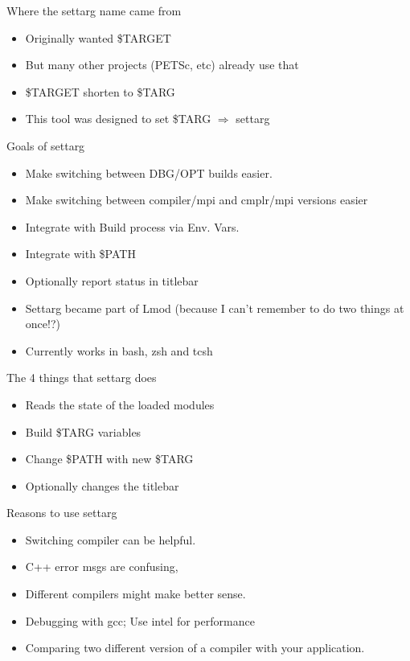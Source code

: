 \documentclass{beamer}
\begin{document}
\begin{frame}{Where the settarg name came from}
  \begin{itemize}
    \item Originally wanted \$TARGET
    \item But many other projects (PETSc, etc) already use that
    \item \$TARGET shorten to \$TARG
    \item This tool was designed to set \$TARG $\Rightarrow$ {\color{blue}settarg}
  \end{itemize}
\end{frame}

\begin{frame}{Goals of settarg}
  \begin{itemize}
    \item Make switching between DBG/OPT builds easier.
    \item Make switching between compiler/mpi and cmplr/mpi versions easier
    \item Integrate with Build process via Env. Vars.
    \item Integrate with \$PATH
    \item Optionally report status in titlebar
    \item Settarg became part of Lmod (because I can't remember to do
      two things at once!?)
    \item Currently works in bash, zsh and tcsh
  \end{itemize}
\end{frame}

\begin{frame}{The 4 things that settarg does}
  \begin{itemize}
    \item Reads the state of the loaded modules
    \item Build \$TARG variables
    \item Change \$PATH with new \$TARG
    \item Optionally changes the titlebar
  \end{itemize}
\end{frame}

\begin{frame}{Reasons to use settarg}
  \begin{itemize}
    \item Switching compiler can be helpful.
    \item C++ error msgs are confusing,
    \item Different compilers might make better sense.
    \item Debugging with gcc; Use intel for performance
    \item Comparing two different version of a compiler with your
      application.
  \end{itemize}
\end{frame}
\end{document}

